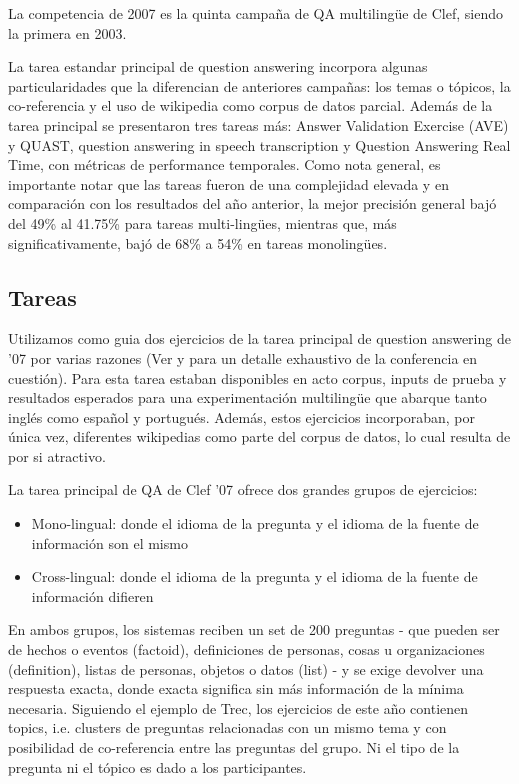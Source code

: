 La competencia de 2007 es la quinta campaña de QA multilingüe de Clef, siendo la primera en 2003.

La tarea estandar principal de question answering incorpora algunas particularidades que la diferencian de anteriores campañas: los temas o tópicos, la co-referencia y el uso de wikipedia como corpus de datos parcial. Además de la tarea principal se presentaron tres tareas más: Answer Validation Exercise (AVE) y QUAST, question answering in speech transcription y Question Answering Real Time, con métricas de performance temporales. Como nota general, es importante notar que las tareas fueron de una complejidad elevada y en comparación con los resultados del año anterior, la mejor precisión general bajó del 49\% al 41.75\% para tareas multi-lingües, mientras que, más significativamente, bajó de 68\% a 54\% en tareas monolingües.


\subsection{Tareas}
\label{subsec:tareas}
Utilizamos como guia dos ejercicios de la tarea principal de question answering de '07  por varias razones (Ver \cite{GuidelineClef07} y \cite{OverviewClef07} para un detalle exhaustivo de la conferencia en cuestión). Para esta tarea estaban disponibles en acto corpus, inputs de prueba y resultados esperados para una experimentación multilingüe que abarque tanto inglés como español y portugués. Además, estos ejercicios incorporaban, por única vez, diferentes wikipedias como parte del corpus de datos, lo cual resulta de por si atractivo. 

La tarea principal de QA de Clef '07 ofrece dos grandes grupos de ejercicios:
\begin{itemize}
\item Mono-lingual: donde el idioma de la pregunta y el idioma de la fuente de información son el mismo
\item Cross-lingual: donde el idioma de la pregunta y el idioma de la fuente de información difieren
\end{itemize}

En ambos grupos, los sistemas reciben un set de 200 preguntas - que pueden ser de hechos o eventos (factoid), definiciones de personas, cosas u organizaciones (definition), listas de personas, objetos o datos (list) - y se exige devolver una respuesta exacta, donde exacta significa sin más información de la mínima necesaria. Siguiendo el ejemplo de Trec, los ejercicios de este año contienen topics, i.e. clusters de preguntas relacionadas con un mismo tema y con posibilidad de co-referencia entre las preguntas del grupo. Ni el tipo de la pregunta ni el tópico es dado a los participantes.

